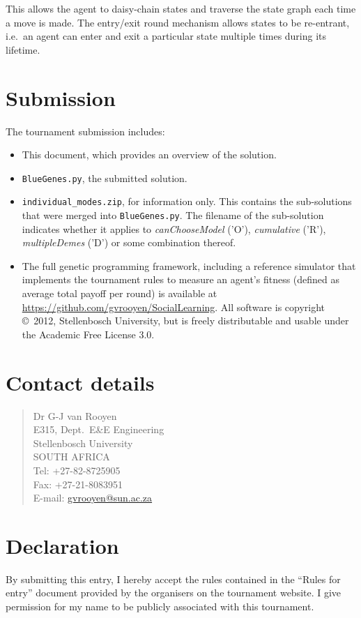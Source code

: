 \documentclass[a4paper,10pt]{article}
\begin{document}
This allows the agent to daisy-chain states and traverse the state graph each time a move is made. The entry/exit round
mechanism allows states to be re-entrant, i.e.\ an agent can enter and exit a particular state multiple times
during its lifetime.

\section{Submission}
The tournament submission includes:
\begin{itemize}
 \item This document, which provides an overview of the solution.
 \item \texttt{BlueGenes.py}, the submitted solution.
 \item \texttt{individual\_modes.zip}, for information only. This contains the sub-solutions that were merged into
   \texttt{BlueGenes.py}. The filename of the sub-solution indicates whether it applies to \emph{canChooseModel}
   ('O'), \emph{cumulative} ('R'), \emph{multipleDemes} ('D') or some combination thereof.
 \item The full genetic programming framework, including a reference simulator that implements the tournament
   rules to measure an agent's fitness (defined as average total payoff per round) is available at
   \href{https://github.com/gvrooyen/SocialLearning}{https://github.com/gvrooyen/SocialLearning}. All software
   is copyright \copyright\ 2012, Stellenbosch University, but is freely distributable and usable under the
   Academic Free License 3.0.
\end{itemize}

\section{Contact details}
{\raggedright
\begin{quote}
 Dr G-J van Rooyen\\
 E315, Dept.\ E\&E Engineering\\
 Stellenbosch University\\
 SOUTH AFRICA\\
 \vspace{2ex}
 Tel: +27-82-8725905\\
 Fax: +27-21-8083951\\
 \vspace{2ex}
 E-mail: \href{mailto:gvrooyen@sun.ac.za}{gvrooyen@sun.ac.za}
\end{quote}
}

\section{Declaration}
By submitting this entry, I hereby accept the rules contained in the ``Rules for entry'' document provided by
the organisers on the tournament website. I give permission for my name to be publicly associated with this tournament.
\end{document}
